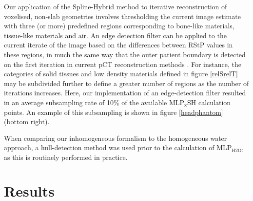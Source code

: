\documentclass[preprint,times]{elsarticle}
\newcommand{\Fig}[1]{figure #1} %
\begin{document}
Our application of the Spline-Hybrid method to iterative reconstruction of voxelised, non-slab geometries involves thresholding the current image estimate with three (or more) predefined regions corresponding to bone-like materials, tissue-like materials and air. An edge detection filter can be applied to the current iterate of the image based on the differences between RStP values in these regions, in much the same way that the outer patient boundary is detected on the first iteration in current pCT reconstruction methods \citep{penfoldMLP,Schultze2014}. For instance, the categories of solid tissues and low density materials defined in \Fig{\ref{relSrelT}} may be subdivided further to define a greater number of regions as the number of iterations increases. Here, our implementation of an edge-detection filter resulted in an average subsampling rate of 10\% of the available MLP$_\mathrm{x}$SH calculation points. An example of this subsampling is shown in \Fig{\ref{headphantom}} (bottom right).

When comparing our inhomogeneous formalism to the homogeneous water approach, a hull-detection method was used prior to the calculation of MLP$_\mathrm{H2O}$, as this is routinely performed in practice. 


\section{Results}
\end{document}
